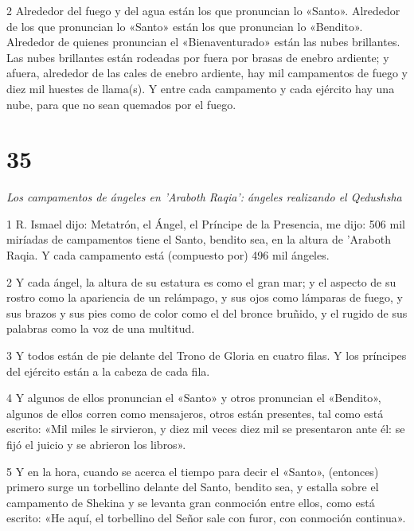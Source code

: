 \par 2 Alrededor del fuego y del agua están los que pronuncian lo «Santo». Alrededor de los que pronuncian lo «Santo» están los que pronuncian lo «Bendito». Alrededor de quienes pronuncian el «Bienaventurado» están las nubes brillantes. Las nubes brillantes están rodeadas por fuera por brasas de enebro ardiente; y afuera, alrededor de las cales de enebro ardiente, hay mil campamentos de fuego y diez mil huestes de llama(s). Y entre cada campamento y cada ejército hay una nube, para que no sean quemados por el fuego.

\chapter{35}

\par \textit{Los campamentos de ángeles en 'Araboth Raqia': ángeles realizando el Qedushsha}

\par 1 R. Ismael dijo: Metatrón, el Ángel, el Príncipe de la Presencia, me dijo: 506 mil miríadas de campamentos tiene el Santo, bendito sea, en la altura de 'Araboth Raqia. Y cada campamento está (compuesto por) 496 mil ángeles.

\par 2 Y cada ángel, la altura de su estatura es como el gran mar; y el aspecto de su rostro como la apariencia de un relámpago, y sus ojos como lámparas de fuego, y sus brazos y sus pies como de color como el del bronce bruñido, y el rugido de sus palabras como la voz de una multitud.

\par 3 Y todos están de pie delante del Trono de Gloria en cuatro filas. Y los príncipes del ejército están a la cabeza de cada fila.

\par 4 Y algunos de ellos pronuncian el «Santo» y otros pronuncian el «Bendito», algunos de ellos corren como mensajeros, otros están presentes, tal como está escrito: «Mil miles le sirvieron, y diez mil veces diez mil se presentaron ante él: se fijó el juicio y se abrieron los libros».

\par 5 Y en la hora, cuando se acerca el tiempo para decir el «Santo», (entonces) primero surge un torbellino delante del Santo, bendito sea, y estalla sobre el campamento de Shekina y se levanta gran conmoción entre ellos, como está escrito: «He aquí, el torbellino del Señor sale con furor, con conmoción continua».

